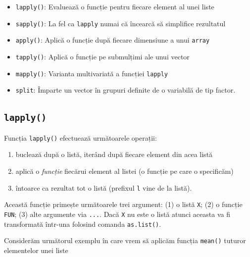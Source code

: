 \documentclass[]{article}
\providecommand{\tightlist}{%
  \setlength{\itemsep}{0pt}\setlength{\parskip}{0pt}}
\newcounter{exo}[section]
\begin{document}
\begin{itemize}
\item
  \texttt{lapply()}: Evaluează o funcție pentru fiecare element al unei
  liste
\item
  \texttt{sapply()}: La fel ca \texttt{lapply} numai că încearcă să
  simplifice rezultatul
\item
  \texttt{apply()}: Aplică o funcție după fiecare dimensiune a unui
  \texttt{array}
\item
  \texttt{tapply()}: Aplică o funcție pe submulțimi ale unui vector
\item
  \texttt{mapply()}: Varianta multivariată a funcției \texttt{lapply}
\item
  \texttt{split}: Împarte un vector în grupuri definite de o variabilă
  de tip factor.
\end{itemize}

\subsection{\texorpdfstring{\texttt{lapply()}}{lapply()}}\label{lapply}

Funcția \texttt{lapply()} efectuează următoarele operații:

\begin{enumerate}
\def\labelenumi{\arabic{enumi}.}
\tightlist
\item
  buclează după o listă, iterând după fiecare element din acea listă
\item
  aplică o \emph{funcție} fiecărui element al listei (o funcție pe care
  o specificăm)
\item
  întoarce ca rezultat tot o listă (prefixul \texttt{l} vine de la
  listă).
\end{enumerate}

Această funcție primește următoarele trei argument: (1) o listă
\texttt{X}; (2) o funcție \texttt{FUN}; (3) alte argumente via
\texttt{...}. Dacă \texttt{X} nu este o listă atunci aceasta va fi
transformată într-una folosind comanda \texttt{as.list()}.

Considerăm următorul exemplu în care vrem să aplicăm funcția
\texttt{mean()} tuturor elementelor unei liste
\end{document}
